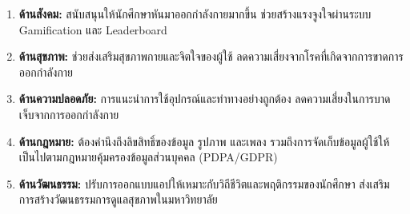 \begin{enumerate}
    \item \textbf{ด้านสังคม:} สนับสนุนให้นักศึกษาหันมาออกกำลังกายมากขึ้น ช่วยสร้างแรงจูงใจผ่านระบบ Gamification และ Leaderboard
    \item \textbf{ด้านสุขภาพ:} ช่วยส่งเสริมสุขภาพกายและจิตใจของผู้ใช้ ลดความเสี่ยงจากโรคที่เกิดจากการขาดการออกกำลังกาย
    \item \textbf{ด้านความปลอดภัย:} การแนะนำการใช้อุปกรณ์และท่าทางอย่างถูกต้อง ลดความเสี่ยงในการบาดเจ็บจากการออกกำลังกาย
    \item \textbf{ด้านกฎหมาย:} ต้องคำนึงถึงลิขสิทธิ์ของข้อมูล รูปภาพ และเพลง รวมถึงการจัดเก็บข้อมูลผู้ใช้ให้เป็นไปตามกฎหมายคุ้มครองข้อมูลส่วนบุคคล (PDPA/GDPR)
    \item \textbf{ด้านวัฒนธรรม:} ปรับการออกแบบแอปให้เหมาะกับวิถีชีวิตและพฤติกรรมของนักศึกษา ส่งเสริมการสร้างวัฒนธรรมการดูแลสุขภาพในมหาวิทยาลัย
\end{enumerate}
